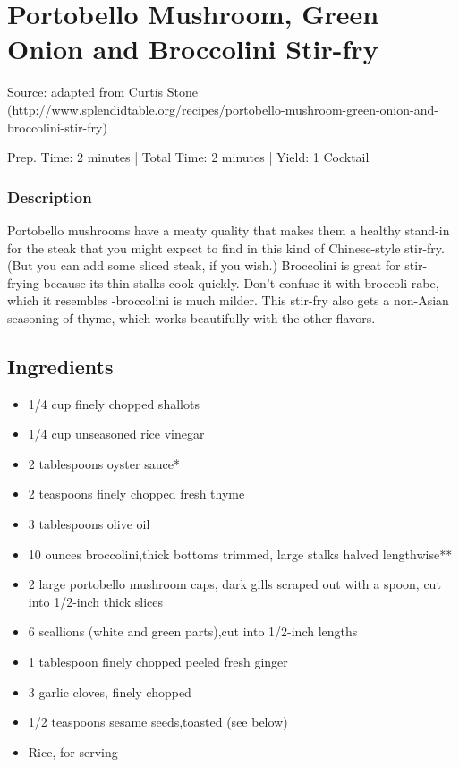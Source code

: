 \section{Portobello Mushroom, Green Onion and Broccolini Stir-fry}

Source: adapted from Curtis Stone (http://www.splendidtable.org/recipes/portobello-mushroom-green-onion-and-broccolini-stir-fry)

\begin{center}
Prep. Time: 2 minutes |
Total Time: 2 minutes | 
Yield: 1 Cocktail
\end{center}

\subsubsection{Description}

Portobello mushrooms have a meaty quality that makes them a healthy stand-in for the steak that you might expect to find in this kind of Chinese-style stir-fry. (But you can add some sliced steak, if you wish.) Broccolini is great for stir-frying because its thin stalks cook quickly. Don't confuse it with broccoli rabe, which it resembles -broccolini is much milder. This stir-fry also gets a non-Asian seasoning of thyme, which works beautifully with the other flavors.

\subsection{Ingredients}
\begin{multicols}{2}
\begin{itemize}
    \item 1/4 cup finely chopped shallots
    \item 1/4 cup unseasoned rice vinegar
    \item 2 tablespoons oyster sauce*
    \item 2 teaspoons finely chopped fresh thyme
    \item 3 tablespoons olive oil
    \item 10 ounces broccolini,thick bottoms trimmed, large stalks halved lengthwise**
    \item 2 large portobello mushroom caps, dark gills scraped out with a spoon, cut into 1/2-inch­ thick slices
    \item 6 scallions (white and green parts),cut into 1/2-inch lengths
    \item 1 tablespoon finely chopped peeled fresh ginger
    \item 3 garlic cloves, finely chopped
    \item 1/2 teaspoons sesame seeds,toasted (see below)
    \item Rice, for serving
\end{itemize}
\end{multicols}

